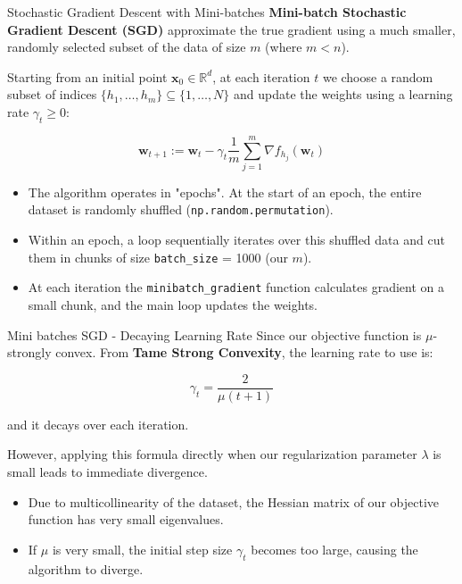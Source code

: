 \documentclass[10pt]{beamer}
\begin{document}
\begin{frame}{Stochastic Gradient Descent with Mini-batches}
    \textbf{Mini-batch Stochastic Gradient Descent (SGD)} approximate the true gradient using a much smaller, randomly selected subset of the data of size $m$ (where $m < n$). 

    \vspace{0.2cm}
    Starting from an initial point $\mathbf{x}_0 \in \mathbb{R}^d$, at each iteration $t$ we choose a random subset of indices $\{h_1, \dots, h_m\} \subseteq \{1, \dots, N\}$ and update the weights using a learning rate $\gamma_t \ge 0$:

    $$\mathbf{w}_{t+1} := \mathbf{w}_t - \gamma_t \frac{1}{m} \sum_{j=1}^m \nabla f_{h_j}(\mathbf{w}_t)$$

    \begin{itemize}
        \item The algorithm operates in "epochs". At the start of an epoch, the entire dataset is randomly shuffled (\texttt{np.random.permutation}).
        \item Within an epoch, a loop sequentially iterates over this shuffled data and cut them in chunks of size \texttt{batch\_size} = 1000 (our $m$).
        \item At each iteration the \texttt{minibatch\_gradient} function calculates gradient on a small chunk, and the main loop updates the weights.
    \end{itemize}

\end{frame}

\begin{frame}{Mini batches SGD - Decaying Learning Rate}
    Since our objective function is $\mu$-strongly convex. From \textbf{Tame Strong Convexity}, the learning rate to use is:
    
    $$\gamma_t = \frac{2}{\mu(t+1)}$$
    
    and it decays over each iteration.

    \vspace{0.4cm}
    However, applying this formula directly when our regularization parameter $\lambda$ is small leads to immediate divergence.

    \vspace{0.2cm}
    \begin{itemize}
        \item Due to multicollinearity of the dataset, the Hessian matrix of our objective function has very small eigenvalues.
        \item If $\mu$ is very small, the initial step size $\gamma_t$ becomes too large, causing the algorithm to diverge.
    \end{itemize}
\end{frame}
\end{document}
